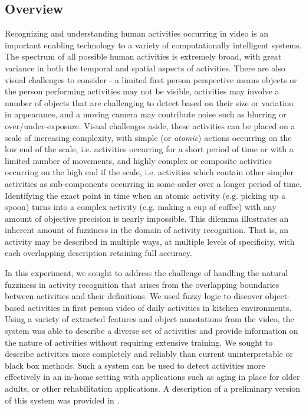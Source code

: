 \documentclass[12pt]{report}
\begin{document}
\subsection{Overview}
Recognizing and understanding human activities occurring in video is an important enabling technology to a variety of computationally intelligent systems. The spectrum of all possible human activities is extremely broad, with great variance in both the temporal and spatial aspects of activities. There are also visual challenges to consider - a limited first person perspective means objects or the person performing activities may not be visible, activities may involve a number of objects that are challenging to detect based on their size or variation in appearance, and a moving camera may contribute noise such as blurring or over/under-exposure. Visual challenges aside, these activities can be placed on a scale of increasing complexity, with simple (or \textit{atomic}) actions occurring on the low end of the scale, i.e. activities occurring for a short period of time or with a limited number of movements, and highly complex or composite activities occurring on the high end if the scale, i.e. activities which contain other simpler activities as sub-components occurring in some order over a longer period of time. Identifying the exact point in time when an atomic activity (e.g. picking up a spoon) turns into a complex activity (e.g. making a cup of coffee) with any amount of objective precision is nearly impossible. This dilemma illustrates an inherent amount of fuzziness in the domain of activity recognition. That is, an activity may be described in multiple ways, at multiple levels of specificity, with each overlapping description retaining full accuracy.

In this experiment, we sought to address the challenge of handling the natural fuzziness in activity recognition that arises from the overlapping boundaries between activities and their definitions. We used fuzzy logic to discover object-based activities in first person video of daily activities in kitchen environments. Using a variety of extracted features and object annotations from the video, the system was able to describe a diverse set of activities and provide information on the nature of activities without requiring extensive training. We sought to describe activities more completely and reliably than current uninterpretable or black box methods. Such a system can be used to detect activities more effectively in an in-home setting with applications such as aging in place for older adults, or other rehabilitation applications. A description of a preliminary version of this system was provided in \cite{Schneider2021BridgingVideo}.
\end{document}
